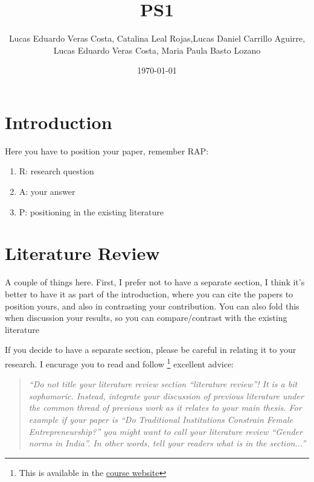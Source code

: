 \documentclass[12pt,a4paper,onecolumn]{article}
\title{PS1 }
\author{Lucas Eduardo Veras Costa,  Catalina Leal Rojas,Lucas Daniel Carrillo Aguirre, Lucas Eduardo Veras Costa, Maria Paula Basto Lozano}
\date{\today}
\begin{document}
\maketitle

\thispagestyle{empty} %

%







\section{Introduction} \label{sec:intro}

Here you have to position your paper, remember RAP:
\begin{enumerate}
    \item R: research question
    \item A: your answer
    \item P: positioning in the existing literature
\end{enumerate}

\section{Literature Review}

A couple of things here. First, I prefer not to have a separate section, I think it's better to have it as part of the introduction, where you can cite the papers to position yours, and also in contrasting your contribution. You can also fold this when discussion your results, so you can compare/contrast with the existing literature


If you decide to have a separate section, please be careful in relating it to your research. I encurage you to read and follow \cite{nikolov2020writing}\footnote{This is available in the \href{https://ignaciomsarmiento.github.io/teaching/Tesis.html}{course website}} excellent advice:

\begin{quote}
    {\it ``Do not title your literature review section ``literature review''! It is a bit sophomoric. Instead, integrate your discussion of previous literature under the common thread of previous work as it relates to your main thesis.  For example if your paper is ``Do Traditional Institutions Constrain Female Entrepreneurship?'' you might want to call your literature review ``Gender norms in India''. In other words, tell your readers what is in the section...''} \citep{nikolov2020writing}
\end{quote}
\end{document}
